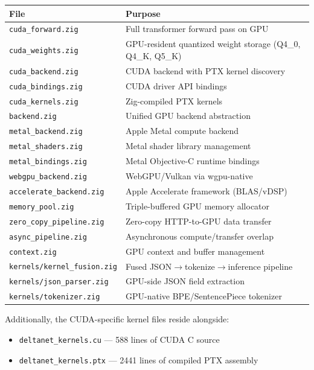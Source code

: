 \documentclass[11pt]{article}
\begin{document}
\begin{longtable}{lp{3.2in}}
\toprule
\textbf{File} & \textbf{Purpose} \\
\midrule
\texttt{cuda\_forward.zig} & Full transformer forward pass on GPU \\
\texttt{cuda\_weights.zig} & GPU-resident quantized weight storage (Q4\_0, Q4\_K, Q5\_K) \\
\texttt{cuda\_backend.zig} & CUDA backend with PTX kernel discovery \\
\texttt{cuda\_bindings.zig} & CUDA driver API bindings \\
\texttt{cuda\_kernels.zig} & Zig-compiled PTX kernels \\
\texttt{backend.zig} & Unified GPU backend abstraction \\
\texttt{metal\_backend.zig} & Apple Metal compute backend \\
\texttt{metal\_shaders.zig} & Metal shader library management \\
\texttt{metal\_bindings.zig} & Metal Objective-C runtime bindings \\
\texttt{webgpu\_backend.zig} & WebGPU/Vulkan via wgpu-native \\
\texttt{accelerate\_backend.zig} & Apple Accelerate framework (BLAS/vDSP) \\
\texttt{memory\_pool.zig} & Triple-buffered GPU memory allocator \\
\texttt{zero\_copy\_pipeline.zig} & Zero-copy HTTP-to-GPU data transfer \\
\texttt{async\_pipeline.zig} & Asynchronous compute/transfer overlap \\
\texttt{context.zig} & GPU context and buffer management \\
\texttt{kernels/kernel\_fusion.zig} & Fused JSON$\to$tokenize$\to$inference pipeline \\
\texttt{kernels/json\_parser.zig} & GPU-side JSON field extraction \\
\texttt{kernels/tokenizer.zig} & GPU-native BPE/SentencePiece tokenizer \\
\bottomrule
\end{longtable}

Additionally, the CUDA-specific kernel files reside alongside:
\begin{itemize}
  \item \texttt{deltanet\_kernels.cu} --- 588 lines of CUDA C source
  \item \texttt{deltanet\_kernels.ptx} --- 2441 lines of compiled PTX assembly
\end{itemize}
\end{document}
